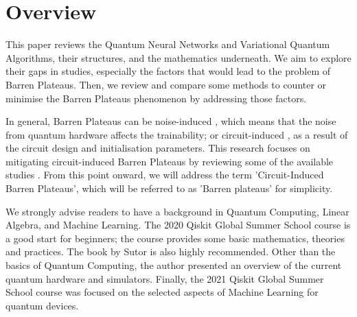\section{Overview}
This paper reviews the Quantum Neural Networks and Variational Quantum Algorithms, their structures, and the mathematics underneath. 
We aim to explore their gaps in studies, especially the factors that would lead to the problem of Barren Plateaus.
Then, we review and compare some methods to counter or minimise the Barren Plateaus phenomenon by addressing those factors.

In general, Barren Plateaus can be noise-induced \cite{wangNoiseinducedBarrenPlateaus2021}, which means that the noise from quantum hardware affects the trainability; 
or circuit-induced \cite{mccleanBarrenPlateausQuantum2018}, as a result of the circuit design and initialisation parameters.
This research focuses on mitigating circuit-induced Barren Plateaus by reviewing some of the available studies \cite{pesahAbsenceBarrenPlateaus2021, cerezoCostFunctionDependent2021, skolikLayerwiseLearningQuantum2021}.
From this point onward, we will address the term 'Circuit-Induced Barren Plateaus', which will be referred to as 'Barren plateaus' for simplicity.

We strongly advise readers to have a background in Quantum Computing, Linear Algebra, and Machine Learning. 
The 2020 Qiskit Global Summer School course \cite{2020QiskitGlobal} is a good start for beginners; the course provides some basic mathematics, theories and practices. 
The book by Sutor \cite{sutorDancingQubitsHow2019} is also highly recommended. 
Other than the basics of Quantum Computing, the author presented an overview of the current quantum hardware and simulators.
Finally, the 2021 Qiskit Global Summer School course \cite{2021QiskitGlobal} was focused on the selected aspects of Machine Learning for quantum devices.